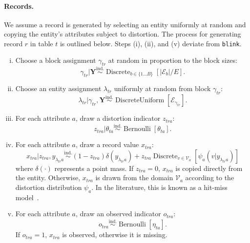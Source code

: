 \documentclass[12pt,letterpaper]{article}
\renewcommand\vec{\bm}
\newcommand{\valset}{\mathcal{V}} %
\newcommand{\partset}{\mathcal{E}} %
\newcommand{\1}[1]{\mathbb{I}\!\left[#1\right]} %
\newcommand{\blink}{\texttt{\upshape \lowercase{blink}}} %
\begin{document}
\paragraph{Records.} We assume a record is generated 
by selecting an entity uniformly at random and 
copying the entity's attributes subject to distortion. 
The process for generating record $r$ in table $t$ is outlined below. 
Steps (i), (ii), and (v) deviate from \blink.
\begin{enumerate}[(i)]
  \item Choose a block assignment $\gamma_{tr}$ at random 
  in proportion to the block sizes:
  \begin{equation}
  \gamma_{tr}|\vec{Y} \overset{\mathrm{ind.}}{\sim}
    \operatorname{Discrete}_{b \in \{1 \ldots B\}}[|\partset_b|/E].
  \end{equation}
  \item Choose an entity assignment $\lambda_{tr}$ uniformly 
  at random from block $\gamma_{tr}$:
  \begin{equation}
  \lambda_{tr}|\gamma_{tr}, \vec{Y} \overset{\mathrm{ind.}}{\sim}
    \operatorname{DiscreteUniform}[\partset_{\gamma_{tr}}].
  \end{equation}
  \item For each attribute $a$, draw a distortion indicator
  $z_{tra}$:
  \begin{equation}
  z_{tra}|\theta_{ta} \overset{\mathrm{ind.}}{\sim}
    \operatorname{Bernoulli}[\theta_{ta}].
  \end{equation}
  \item For each attribute $a$, draw a record value $x_{tra}$:
  \begin{equation}
  x_{tra}|z_{tra}, y_{\lambda_{tr}a} \overset{\mathrm{ind.}}{\sim}
  (1 - z_{tra}) \delta(y_{\lambda_{tr}a}) + z_{tra} 
  \operatorname{Discrete}_{v \in \valset_{a}}[\psi_{a}(v|y_{\lambda_{tr}a})]
  \end{equation}
  where $\delta(\cdot)$ represents a point mass.
  If $z_{tra} = 0$, $x_{tra}$ is copied directly from the 
  entity.
  Otherwise, $x_{tra}$ is drawn from the domain $\valset_{a}$ 
  according to the distortion distribution $\psi_{a}$.
  In the literature, this is known as a hit-miss 
  model~\citep{copas_record_1990}.
  \item For each attribute $a$, draw an observed indicator $o_{tra}$:
  \begin{equation}
    o_{tra} \overset{\mathrm{ind.}}{\sim} \operatorname{Bernoulli}[\eta_{ta}].
  \end{equation}
  If $o_{tra} = 1$, $x_{tra}$ is observed, otherwise it is 
  missing.
\end{enumerate}
\end{document}
